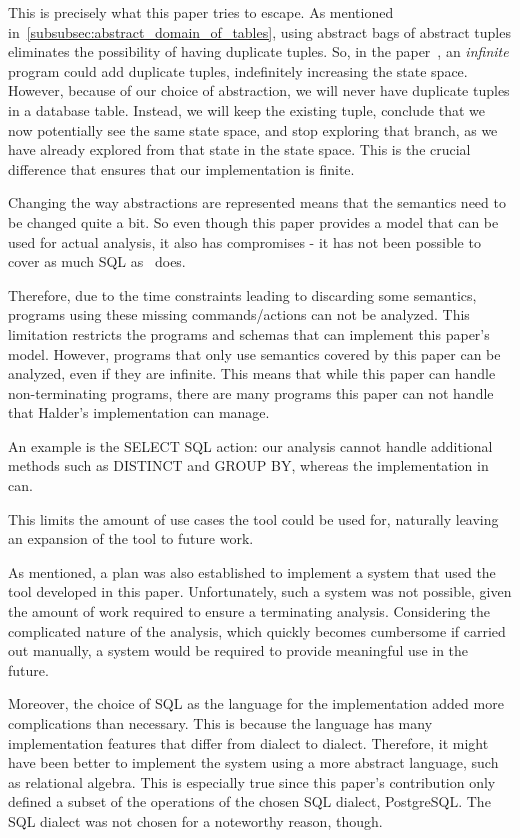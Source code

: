 This is precisely what this paper tries to escape.
As mentioned in~\autoref{subsubsec:abstract_domain_of_tables}, using abstract bags of abstract tuples eliminates the possibility of having duplicate tuples.
So, in the paper~\cite{halder_abstract_2012}, an \textit{infinite} program could add duplicate tuples, indefinitely increasing the state space.
However, because of our choice of abstraction, we will never have duplicate tuples in a database table.
Instead, we will keep the existing tuple, conclude that we now potentially see the same state space, and stop exploring that branch, as we have already explored from that state in the state space.
This is the crucial difference that ensures that our implementation is finite.

Changing the way abstractions are represented means that the semantics need to be changed quite a bit.
So even though this paper provides a model that can be used for actual analysis, it also has compromises - it has not been possible to cover as much SQL as~\cite{halder_abstract_2012} does.


Therefore, due to the time constraints leading to discarding some semantics, programs using these missing commands/actions can not be analyzed.
This limitation restricts the programs and schemas that can implement this paper's model.
However, programs that only use semantics covered by this paper can be analyzed, even if they are infinite.
This means that while this paper can handle non-terminating programs, there are many programs this paper can not handle that Halder's implementation can manage.

An example is the SELECT SQL action: our analysis cannot handle additional methods such as DISTINCT and GROUP BY, whereas the implementation in~\cite{halder_abstract_2012} can.



This limits the amount of use cases the tool could be used for, naturally leaving an expansion of the tool to future work.

As mentioned, a plan was also established to implement a system that used the tool developed in this paper.
Unfortunately, such a system was not possible, given the amount of work required to ensure a terminating analysis.
Considering the complicated nature of the analysis, which quickly becomes cumbersome if carried out manually, a system would be required to provide meaningful use in the future.

Moreover, the choice of SQL as the language for the implementation added more complications than necessary.
This is because the language has many implementation features that differ from dialect to dialect.
Therefore, it might have been better to implement the system using a more abstract language, such as relational algebra.
This is especially true since this paper's contribution only defined a subset of the operations of the chosen SQL dialect, PostgreSQL.
The SQL dialect was not chosen for a noteworthy reason, though.

